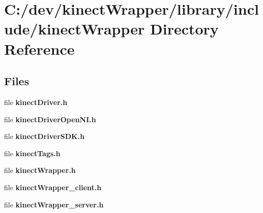 \section{C\+:/dev/kinect\+Wrapper/library/include/kinect\+Wrapper Directory Reference}
\label{dir_1caf105552615038a067a5e0b3628349}
\subsection*{Files}
\begin{DoxyCompactItemize}
\item 
file {\bfseries kinect\+Driver.\+h}
\item 
file {\bfseries kinect\+Driver\+Open\+N\+I.\+h}
\item 
file {\bfseries kinect\+Driver\+S\+D\+K.\+h}
\item 
file {\bfseries kinect\+Tags.\+h}
\item 
file {\bfseries kinect\+Wrapper.\+h}
\item 
file {\bfseries kinect\+Wrapper\+\_\+client.\+h}
\item 
file {\bfseries kinect\+Wrapper\+\_\+server.\+h}
\end{DoxyCompactItemize}
